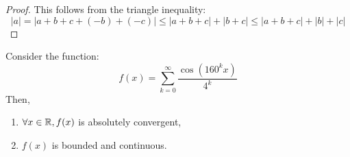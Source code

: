 \begin{proof}
    This follows from the triangle inequality:
    \begin{equation*}
        |a| = |a + b + c + (-b) + (-c)| \leq |a + b + c| + |b + c| \leq |a + b + c| + |b| + |c|
    \end{equation*}
\end{proof}

\begin{theorem}
    Consider the function:
    \begin{equation}
        f(x) = \sum \limits_{k = 0}^\infty \frac{\cos (160^k x)}{4^k}
    \end{equation}
    Then,
    \begin{enumerate}
        \item $\forall x \in \mathbb{R}, f(x)$ is absolutely convergent,
        \item $f(x)$ is bounded and continuous.
    \end{enumerate}
\end{theorem}

